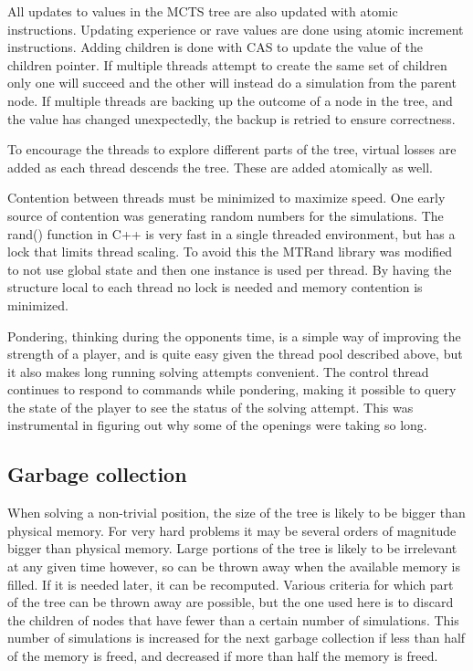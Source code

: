 All updates to values in the MCTS tree are also updated with atomic instructions. Updating experience or rave values are done using atomic increment instructions. Adding children is done with CAS to update the value of the children pointer. If multiple threads attempt to create the same set of children only one will succeed and the other will instead do a simulation from the parent node. If multiple threads are backing up the outcome of a node in the tree, and the value has changed unexpectedly, the backup is retried to ensure correctness.

To encourage the threads to explore different parts of the tree, virtual losses are added as each thread descends the tree. These are added atomically as well.

Contention between threads must be minimized to maximize speed. One early source of contention was generating random numbers for the simulations. The rand() function in C++ is very fast in a single threaded environment, but has a lock that limits thread scaling. To avoid this the MTRand library was modified to not use global state and then one instance is used per thread. By having the structure local to each thread no lock is needed and memory contention is minimized.

Pondering, thinking during the opponents time, is a simple way of improving the strength of a player, and is quite easy given the thread pool described above, but it also makes long running solving attempts convenient. The control thread continues to respond to commands while pondering, making it possible to query the state of the player to see the status of the solving attempt. This was instrumental in figuring out why some of the openings were taking so long.


\subsection{Garbage collection}\label{sec:gc}

When solving a non-trivial position, the size of the tree is likely to be bigger than physical memory. For very hard problems it may be several orders of magnitude bigger than physical memory. Large portions of the tree is likely to be irrelevant at any given time however, so can be thrown away when the available memory is filled. If it is needed later, it can be recomputed. Various criteria for which part of the tree can be thrown away are possible, but the one used here is to discard the children of nodes that have fewer than a certain number of simulations. This number of simulations is increased for the next garbage collection if less than half of the memory is freed, and decreased if more than half the memory is freed.


